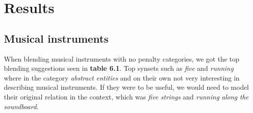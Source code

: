 
\chapter{Results} %

\label{Chapter6} %


\section{Musical instruments}
When blending musical instruments with no penalty categories, we got the top blending suggestions seen in \textbf{table 6.1}. Top synsets such as \emph{five} and \emph{running} where in the category \emph{abstract entities} and on their own not very interesting in describing musical instruments. If they were to be useful, we would need to model their original relation in the context, which was \emph{five strings} and \emph{running along the soundboard}.

